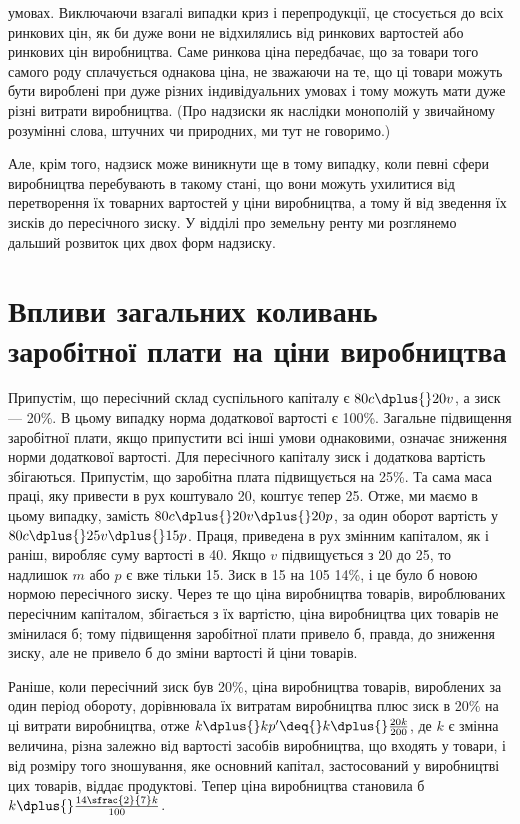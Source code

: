 \parcont{}  %
умовах. Виключаючи взагалі випадки криз і перепродукції, це
стосується до всіх ринкових цін, як би дуже вони не відхилялись
від ринкових вартостей або ринкових цін виробництва.
Саме ринкова ціна передбачає, що за товари того самого роду
сплачується однакова ціна, не зважаючи на те, що ці товари
можуть бути вироблені при дуже різних індивідуальних умовах
і тому можуть мати дуже різні витрати виробництва. (Про надзиски
як наслідки монополій у звичайному розумінні слова, штучних
чи природних, ми тут не говоримо.)

Але, крім того, надзиск може виникнути ще в тому випадку,
коли певні сфери виробництва перебувають в такому стані, що
вони можуть ухилитися від перетворення їх товарних вартостей
у ціни виробництва, а тому й від зведення їх зисків до пересічного
зиску. У відділі про земельну ренту ми розглянемо
дальший розвиток цих двох форм надзиску.

\section{Впливи загальних коливань заробітної плати
на ціни виробництва}

Припустім, що пересічний склад суспільного капіталу є
$80 c \dplus{} 20 v$, а зиск — 20\%. В цьому випадку норма додаткової
вартості є 100\%. Загальне підвищення заробітної плати, якщо
припустити всі інші умови однаковими, означає зниження норми
додаткової вартості. Для пересічного капіталу зиск і додаткова
вартість збігаються. Припустім, що заробітна плата підвищується
на 25\%. Та сама маса праці, яку привести в рух коштувало 20,
коштує тепер 25. Отже, ми маємо в цьому випадку, замість
$80 c \dplus{} 20 v \dplus{} 20 p$, за один оборот вартість у $80 c \dplus{} 25 v \dplus{} 15 p$.
Праця, приведена в рух змінним капіталом, як і раніш, виробляє
суму вартості в 40. Якщо $v$ підвищується з 20 до 25, то надлишок
$m$ або $p$ є вже тільки \deq{} 15. Зиск в 15 на 105 \deq{} 14\%,
і це було б новою нормою пересічного зиску. Через те що
ціна виробництва товарів, вироблюваних пересічним капіталом,
збігається з їх вартістю, ціна виробництва цих товарів не змінилася
б; тому підвищення заробітної плати привело б, правда,
до зниження зиску, але не привело б до зміни вартості й ціни
товарів.

Раніше, коли пересічний зиск був \deq{} 20\%, ціна виробництва
товарів, вироблених за один період обороту, дорівнювала їх
витратам виробництва плюс зиск в 20\% на ці витрати виробництва,
отже \deq{} $k \dplus{} kp' \deq{} k \dplus{} \frac{20k}{200}$, де $k$ є змінна величина, різна
залежно від вартості засобів виробництва, що входять у товари,
і від розміру того зношування, яке основний капітал, застосований
у виробництві цих товарів, віддає продуктові. Тепер
ціна виробництва становила б $k \dplus{} \frac{14\sfrac{2}{7} k }{100}$.
